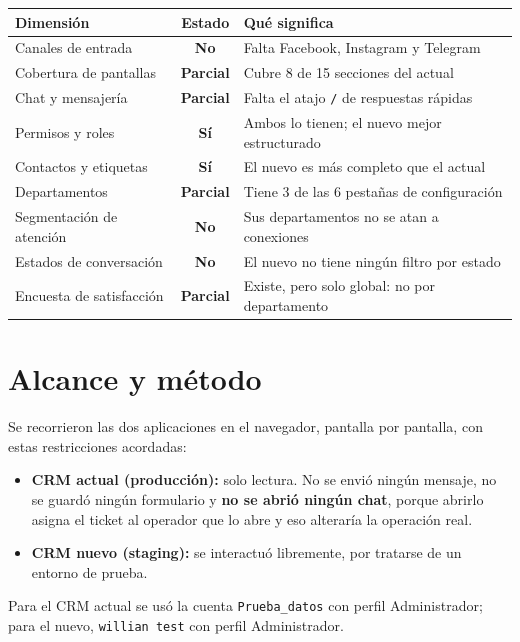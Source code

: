 \documentclass[11pt,a4paper]{article}
\newcommand{\cod}[1]{\texttt{\small #1}}
\newcommand{\si}{\textcolor{ok}{\textbf{Sí}}}
\newcommand{\no}{\textcolor{warn}{\textbf{No}}}
\newcommand{\parcial}{\textcolor{accent}{\textbf{Parcial}}}
\begin{document}
\begin{center}
\begin{tabularx}{\textwidth}{@{}lcL@{}}
\toprule
\textbf{Dimensión} & \textbf{Estado} & \textbf{Qué significa} \\
\midrule
Canales de entrada      & \no       & Falta Facebook, Instagram y Telegram \\
Cobertura de pantallas  & \parcial  & Cubre 8 de 15 secciones del actual \\
Chat y mensajería       & \parcial  & Falta el atajo \cod{/} de respuestas rápidas \\
Permisos y roles        & \si       & Ambos lo tienen; el nuevo mejor estructurado \\
Contactos y etiquetas   & \si       & El nuevo es más completo que el actual \\
Departamentos           & \parcial  & Tiene 3 de las 6 pestañas de configuración \\
Segmentación de atención& \no       & Sus departamentos no se atan a conexiones \\
Estados de conversación & \no       & El nuevo no tiene ningún filtro por estado \\
Encuesta de satisfacción& \parcial  & Existe, pero solo global: no por departamento \\
\bottomrule
\end{tabularx}
\end{center}

\section{Alcance y método}

Se recorrieron las dos aplicaciones en el navegador, pantalla por pantalla, con estas
restricciones acordadas:

\begin{itemize}
  \item \textbf{CRM actual (producción):} solo lectura. No se envió ningún mensaje, no
        se guardó ningún formulario y \textbf{no se abrió ningún chat}, porque abrirlo
        asigna el ticket al operador que lo abre y eso alteraría la operación real.
  \item \textbf{CRM nuevo (staging):} se interactuó libremente, por tratarse de un
        entorno de prueba.
\end{itemize}

Para el CRM actual se usó la cuenta \cod{Prueba\_datos} con perfil Administrador; para
el nuevo, \cod{willian test} con perfil Administrador.
\end{document}
